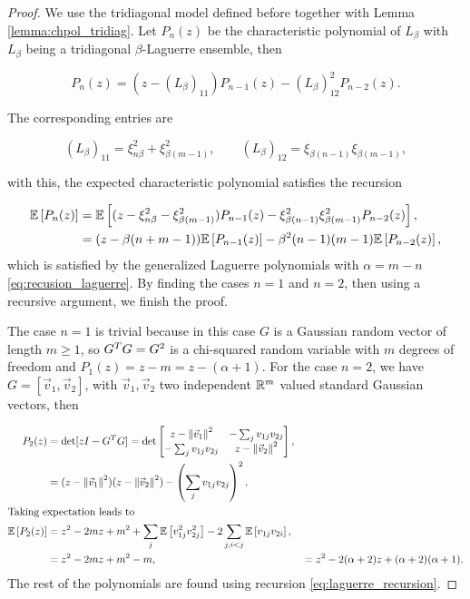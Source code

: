 \begin{proof}
    We use the tridiagonal model defined before together with Lemma \ref{lemma:chpol_tridiag}. Let $P_n(z)$ be the characteristic polynomial of $L_\beta$ with $L_\beta$ being a tridiagonal $\beta$-Laguerre ensemble, then

    \begin{equation*}
        P_n(z) = (z - (L_\beta)_{11})P_{n-1}(z) - (L_\beta)_{12}^2 P_{n-2}(z).
    \end{equation*}

    The corresponding entries are

    \begin{equation*}
        (L_\beta)_{11} = \xi^2_{n\beta} + \xi^2_{\beta(m-1)}, \qquad (L_\beta)_{12} = \xi_{\beta(n-1)}\xi_{\beta(m-1)},
    \end{equation*}

    \noindent with this, the expected characteristic polynomial satisfies the recursion

    \begin{align}
        \mathbb E \left[ P_n(z) \right] &= \mathbb E \left[  (z - \xi^2_{n\beta} - \xi^2_{\beta(m-1)})P_{n-1}(z) - \xi^2_{\beta(n-1)}\xi_{\beta(m-1)}^2 P_{n-2}(z)  \right],\notag \\ 
        &= (z - \beta(n + m - 1))\mathbb E \left[ P_{n-1}(z) \right] - \beta^2(n-1)(m-1)\mathbb E \left[ P_{n-2}(z) \right], \label{eq:laguerre_recursion}
    \end{align}
    which is satisfied by the generalized Laguerre polynomials with $\alpha=m-n$ \eqref{eq:recusion_laguerre}. By finding the cases $n=1$ and $n=2$, then using a recursive argument, we finish the proof.

    The case $n=1$ is trivial because in this case $G$ is a Gaussian random vector of length $m\ge1$, so $G^TG = G^2$ is a chi-squared random variable with $m$ degrees of freedom and $P_1(z) = z - m = z - (\alpha+1)$. For the case $n=2$, we have $G=[\vec v_1, \vec v_2]$, with $\vec v_1,\vec v_2$ two independent $\mathbb R^m$ valued standard Gaussian vectors, then 

    \begin{align*}
        P_2(z) &= \det[zI - G^TG] = \det\begin{bmatrix}
            z- \left\lVert\vec v_1\right\rVert^2 & -\sum_{j} v_{1j}v_{2j} \\
            -\sum_{j} v_{1j}v_{2j} & z - \left\lVert\vec v_2\right\rVert^2
        \end{bmatrix}, \\
        &= (z- \left\lVert\vec v_1\right\rVert^2)(z - \left\lVert\vec v_2\right\rVert^2) -\left(\sum_{j} v_{1j}v_{2j} \right)^2.\\
        \intertext{Taking expectation leads to}
        \mathbb E \left[ P_2(z) \right] &= z^2 - 2mz + m^2 + \sum_{j} \mathbb E \left[ v_{1j}^2 v_{2j}^2 \right] - 2\sum_{j,i<j} \mathbb E \left[ v_{1j}v_{2i} \right], \\
        &= z^2 - 2mz + m^2 - m,
        &= z^2 - 2(\alpha+2)z + (\alpha+2)(\alpha + 1).
    \end{align*}
The rest of the polynomials are found using recursion \eqref{eq:laguerre_recursion}.
\end{proof}

